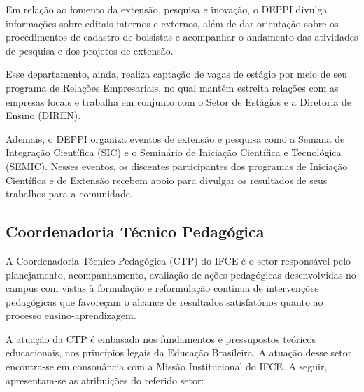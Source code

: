 \documentclass{paper}
\begin{document}
Em relação ao fomento da extensão, pesquisa e inovação, o DEPPI divulga informações sobre editais internos e externos, além de dar orientação sobre os procedimentos de cadastro de bolsistas e acompanhar o andamento das atividades de pesquisa e dos projetos de extensão. 

Esse departamento, ainda, realiza captação de vagas de estágio por meio de seu programa de Relações Empresariais, no qual mantém estreita relações com as empresas locais e trabalha em conjunto com o Setor de Estágios e a Diretoria de Ensino (DIREN). 

Ademais, o DEPPI organiza eventos de extensão e pesquisa como a Semana de Integração Científica (SIC) e o Seminário de Iniciação Científica e Tecnológica (SEMIC). Nesses eventos, os discentes participantes dos programas de Iniciação Científica e de Extensão recebem apoio para divulgar os resultados de seus trabalhos para a comunidade.

\subsection{Coordenadoria Técnico Pedagógica}

A Coordenadoria Técnico-Pedagógica (CTP) do IFCE é o setor responsável pelo planejamento, acompanhamento, avaliação de ações pedagógicas desenvolvidas no campus com vistas à formulação e reformulação contínua de intervenções pedagógicas que favoreçam o alcance de resultados satisfatórios quanto ao processo ensino-aprendizagem.

A atuação da CTP é embasada nos fundamentos e pressupostos teóricos educacionais, nos princípios legais da Educação Brasileira. A atuação desse setor encontra-se em consonância com a Missão Institucional do IFCE. A seguir, apresentam-se as atribuições do referido setor:
\end{document}
